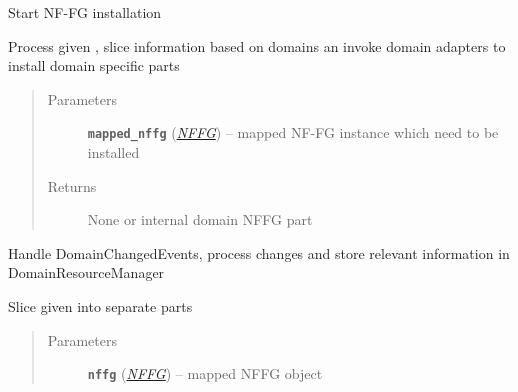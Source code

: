 \documentclass[letterpaper,10pt,english]{sphinxmanual}
\begin{document}
\begin{fulllineitems}
\begin{fulllineitems}
\end{fulllineitems}


\begin{fulllineitems}
\label{adapt/adaptation:escape.adapt.adaptation.ControllerAdapter.install_nffg}
Start NF-FG installation

Process given {\hyperref[util/nffg:escape.util.nffg.NFFG]{\emph{}}}, slice information based on domains an invoke
domain adapters to install domain specific parts
\begin{quote}\begin{description}
\item[{Parameters}] \leavevmode
\textbf{\texttt{mapped\_nffg}} ({\hyperref[util/nffg:escape.util.nffg.NFFG]{\emph{\emph{NFFG}}}}) -- mapped NF-FG instance which need to be installed

\item[{Returns}] \leavevmode
None or internal domain NFFG part

\end{description}\end{quote}

\end{fulllineitems}


\begin{fulllineitems}
\label{adapt/adaptation:escape.adapt.adaptation.ControllerAdapter._handle_DomainChangedEvent}
Handle DomainChangedEvents, process changes and store relevant information
in DomainResourceManager

\end{fulllineitems}


\begin{fulllineitems}
\label{adapt/adaptation:escape.adapt.adaptation.ControllerAdapter._slice_into_domains}
Slice given {\hyperref[util/nffg:escape.util.nffg.NFFG]{\emph{}}} into separate parts
\begin{quote}\begin{description}
\item[{Parameters}] \leavevmode
\textbf{\texttt{nffg}} ({\hyperref[util/nffg:escape.util.nffg.NFFG]{\emph{\emph{NFFG}}}}) -- mapped NFFG object


\end{description}
\end{quote}
\end{fulllineitems}
\end{fulllineitems}
\end{document}

